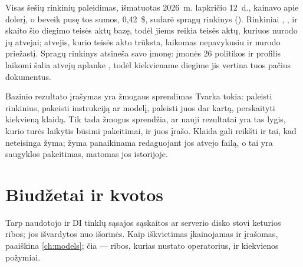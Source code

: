 Visas šešių rinkinių paleidimas, išmatuotas 2026~m. lapkričio 12~d., kainavo apie dolerį, o beveik
pusę tos sumos, 0,42~\$, sudarė spragų rinkinys ().
Rinkiniai , ,  ir
 skaito šio diegimo teisės aktų bazę, todėl jiems reikia teisės aktų, kuriuos
nurodo jų atvejai; atvejis, kurio teisės akto trūksta, laikomas nepavykusiu ir nurodo priežastį.
Spragų rinkinys atsineša savo įmonę: \demo{} įmonės 26 politikos ir profilis laikomi šalia atvejų aplanke
, todėl kiekviename diegime jis vertina tuos pačius dokumentus.

\begin{humanbox}{Bazinio rezultato įrašymas yra žmogaus sprendimas}
Tvarka tokia: paleisti rinkinius, pakeisti instrukciją ar modelį, paleisti juos dar kartą,
perskaityti kiekvieną klaidą. Tik tada žmogus sprendžia, ar nauji rezultatai yra tas lygis,
kurio turės laikytis būsimi pakeitimai, ir juos įrašo. Klaida gali reikšti ir tai, kad neteisinga
žyma; žyma panaikinama redaguojant jos atvejo failą, o tai yra saugyklos pakeitimas, matomas jos
istorijoje.
\end{humanbox}


\section{Biudžetai ir kvotos}\label{sec:ops:budgets}

Tarp naudotojo ir DI tinklų sąsajos sąskaitos ar serverio disko stovi keturios ribos; jos
išvardytos nuo išorinės.
Kaip iškvietimas įkainojamas ir įrašomas, paaiškina \cref{ch:models}; čia --- ribos, kurias
nustato operatorius, ir kiekvienos požymiai.

